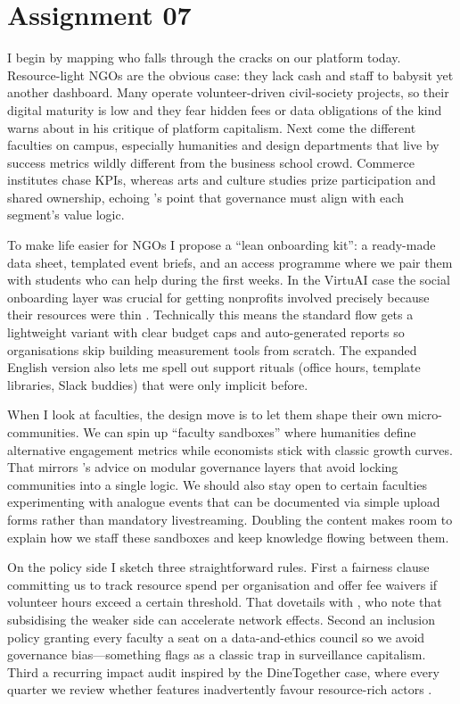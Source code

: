 \section*{Assignment 07}

I begin by mapping who falls through the cracks on our platform today. Resource-light NGOs are the obvious case: they lack cash and staff to babysit yet another dashboard. Many operate volunteer-driven civil-society projects, so their digital maturity is low and they fear hidden fees or data obligations of the kind \citet{Srnicek2017} warns about in his critique of platform capitalism. Next come the different faculties on campus, especially humanities and design departments that live by success metrics wildly different from the business school crowd. Commerce institutes chase KPIs, whereas arts and culture studies prize participation and shared ownership, echoing \citet{Choudary2016}'s point that governance must align with each segment’s value logic.

To make life easier for NGOs I propose a ``lean onboarding kit'': a ready-made data sheet, templated event briefs, and an access programme where we pair them with students who can help during the first weeks. In the VirtuAI case the social onboarding layer was crucial for getting nonprofits involved precisely because their resources were thin \citep{Gunasilan2024}. Technically this means the standard flow gets a lightweight variant with clear budget caps and auto-generated reports so organisations skip building measurement tools from scratch. The expanded English version also lets me spell out support rituals (office hours, template libraries, Slack buddies) that were only implicit before.

When I look at faculties, the design move is to let them shape their own micro-communities. We can spin up ``faculty sandboxes'' where humanities define alternative engagement metrics while economists stick with classic growth curves. That mirrors \citet{Reillier2017}'s advice on modular governance layers that avoid locking communities into a single logic. We should also stay open to certain faculties experimenting with analogue events that can be documented via simple upload forms rather than mandatory livestreaming. Doubling the content makes room to explain how we staff these sandboxes and keep knowledge flowing between them.

On the policy side I sketch three straightforward rules. First a fairness clause committing us to track resource spend per organisation and offer fee waivers if volunteer hours exceed a certain threshold. That dovetails with \citet{ShapiroVarian1999}, who note that subsidising the weaker side can accelerate network effects. Second an inclusion policy granting every faculty a seat on a data-and-ethics council so we avoid governance bias---something \citet{Zuboff2019} flags as a classic trap in surveillance capitalism. Third a recurring impact audit inspired by the DineTogether case, where every quarter we review whether features inadvertently favour resource-rich actors \citep{Rennella2023}.

